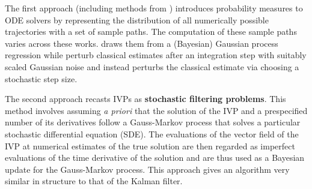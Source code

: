 The first approach (including methods from \textcolor{blue}{\cite{chkrebtii2016bayesian,conrad2017statistical,teymur2016probabilistic,lie2019strong,abdulle2020random,teymur2018implicit}}) introduces probability measures to ODE solvers by representing the distribution of all numerically possible trajectories with a set of sample paths. The computation of these sample paths varies across these works. \textcolor{blue}{\cite{chkrebtii2016bayesian}} draws them from a (Bayesian) Gaussian process regression while \textcolor{blue}{\cite{conrad2017statistical,teymur2016probabilistic,lie2019strong,teymur2018implicit}} perturb classical estimates after an integration step with suitably scaled Gaussian noise and \textcolor{blue}{\cite{abdulle2020random}} instead perturbs the classical estimate via choosing a stochastic step size.

The second approach \textcolor{blue}{\cite{schober2014probabilistic,kersting2016active,magnani2017bayesian,schober2019probabilistic,tronarp2019probabilistic,kersting2018convergence}} recasts IVPs as \textbf{stochastic filtering problems}. This method involves assuming \textit{a priori} that the solution of the IVP and a prespecified number of its derivatives follow a Gauss-Markov process that solves a particular stochastic differential equation (SDE). The evaluations of the vector field of the IVP at numerical estimates of the true solution are then regarded as imperfect evaluations of the time derivative of the solution and are thus used as a Bayesian update for the Gauss-Markov process. This approach gives an algorithm very similar in structure to that of the Kalman filter.

